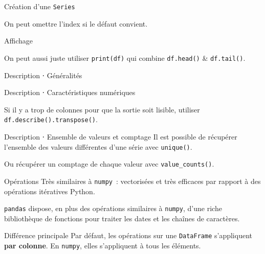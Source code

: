 \begin{frame}{Création d'une \texttt{Series}}

  On peut omettre l'index si le défaut convient.
\end{frame}

\begin{frame}{Affichage}

  On peut aussi juste utiliser \texttt{print(df)} qui combine \texttt{df.head()} \& \texttt{df.tail()}.
\end{frame}

\begin{frame}{Description ⋅ Généralités}
\end{frame}

\begin{frame}{Description ⋅ Caractéristiques numériques}

  Si il y a trop de colonnes pour que la sortie soit lisible, utiliser \texttt{df.describe().transpose()}.
\end{frame}

\begin{frame}{Description ⋅ Ensemble de valeurs et comptage}
  Il est possible de récupérer l'ensemble des valeurs différentes d'une série avec \texttt{unique()}.
  
  Ou récupérer un comptage de chaque valeur avec \texttt{value\_counts()}.
\end{frame}

\begin{frame}{Opérations}
  Très similaires à \texttt{numpy}~: vectorisées et très efficaces par rapport à des opérations itératives Python.

  \texttt{pandas} dispose, en plus des opérations similaires à \texttt{numpy}, d'une riche bibliothèque de fonctions pour traiter les dates et les chaînes de caractères.

  \begin{alertblock}{Différence principale}
    Par défaut, les opérations sur une \texttt{DataFrame} s'appliquent \textbf{par colonne}. En \texttt{numpy}, elles s'appliquent à tous les éléments.
  \end{alertblock}
\end{frame}

